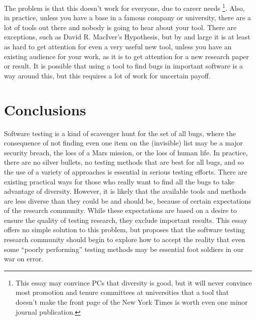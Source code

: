 \documentclass[sigplan,review]{acmart}
\begin{document}
The problem is that this doesn't work for everyone, due to career
needs \footnote{This essay may convince PCs that diversity is good,
  but it will never convince most promotion and tenure committees at
  universities that a tool that doesn't make the front page of the New
  York Times is worth even one minor journal publication.}.  Also, in practice,
unless you have a base in a famous company or university, there are a
lot of tools out there and nobody is going to hear about your tool.
There are exceptions, such as David R. MacIver's Hypothesis, but by
and large it is at least as hard to get attention for even a very
useful new tool, unless you have an existing audience for your work,
as it is to get attention for a new research paper or result.  It is
possible that using a tool to find bugs in important software is a way
around this, but this requires a lot of work for uncertain payoff.

\section{Conclusions}

Software testing is a kind of scavenger hunt for the set of all bugs,
where the consequence of not finding even one item on the (invisible)
list may be a major security breach, the loss of a Mars mission, or
the loss of human life.  In practice, there are no silver bullets, no
testing methods that are best for all bugs, and so the use of a
variety of approaches is essential in serious testing efforts.  There
are existing practical ways for those who really want to find all the
bugs to take advantage of diversity.  However, it is likely that the
available tools and methods are less diverse than they could be and
should be, because of certain expectations of the research community.
While these expectations are based on a desire to ensure the quality
of testing research, they exclude important results.   This essay
offers no simple solution to this problem, but proposes that the
software testing research community should begin to explore how to
accept the reality that even some ``poorly performing'' testing methods may
be essential foot soldiers in our war on error.



\end{document}
